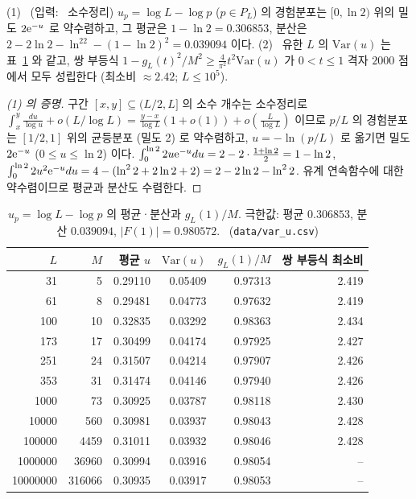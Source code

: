 \begin{proposition}\label{NUM:prop-var}
(1) \PROVED\ (입력: \EXT\ 소수정리) $u_p=\log L-\log p$ ($p\in P_L$) 의 경험분포는 $[0,\ln2)$ 위의 밀도 $2\mathrm{e}^{-u}$ 로 약수렴하고,
그 평균은 $1-\ln2=0.306853$, 분산은 $2-2\ln2-\ln^22-(1-\ln2)^2=0.039094$ 이다.
(2) \NUMERIC\ 유한 $L$ 의 $\mathrm{Var}(u)$ 는 표~\ref{NUM:tab-var} 와 같고, 쌍 부등식
$1-g_L(t)^2/M^2\ge\frac{4}{\pi^2}t^2\mathrm{Var}(u)$ 가 $0<t\le1$ 격자 $2000$ 점에서 모두 성립한다 (최소비 $\approx2.42$; $L\le10^5$).
\end{proposition}
\begin{proof}[(1) 의 증명]
구간 $[x,y]\subseteq(L/2,L]$ 의 소수 개수는 소수정리로 $\int_x^y\frac{du}{\log u}+o(L/\log L)=\frac{y-x}{\log L}(1+o(1))+o(\frac L{\log L})$ 이므로
$p/L$ 의 경험분포는 $[1/2,1]$ 위의 균등분포 (밀도 2) 로 약수렴하고, $u=-\ln(p/L)$ 로 옮기면 밀도 $2\mathrm{e}^{-u}$ ($0\le u\le\ln2$) 이다.
$\int_0^{\ln2}2u\mathrm{e}^{-u}du=2-2\cdot\frac{1+\ln2}{2}=1-\ln2$, $\int_0^{\ln2}2u^2\mathrm{e}^{-u}du=4-(\ln^22+2\ln2+2)=2-2\ln2-\ln^22$.
유계 연속함수에 대한 약수렴이므로 평균과 분산도 수렴한다.
\end{proof}

\begin{table}[ht]\centering\small
\begin{tabular}{rrrrrr}
\toprule
$L$ & $M$ & 평균 $u$ & $\mathrm{Var}(u)$ & $g_L(1)/M$ & 쌍 부등식 최소비\\
\midrule
31 & 5 & 0.29110 & 0.05409 & 0.97313 & 2.419\\
61 & 8 & 0.29481 & 0.04773 & 0.97632 & 2.419\\
100 & 10 & 0.32835 & 0.03292 & 0.98363 & 2.434\\
173 & 17 & 0.30499 & 0.04174 & 0.97925 & 2.427\\
251 & 24 & 0.31507 & 0.04214 & 0.97907 & 2.426\\
353 & 31 & 0.31474 & 0.04146 & 0.97940 & 2.426\\
1000 & 73 & 0.30925 & 0.03787 & 0.98118 & 2.430\\
10000 & 560 & 0.30981 & 0.03937 & 0.98043 & 2.428\\
100000 & 4459 & 0.31011 & 0.03932 & 0.98046 & 2.428\\
1000000 & 36960 & 0.30994 & 0.03916 & 0.98054 & --\\
10000000 & 316066 & 0.30935 & 0.03917 & 0.98053 & --\\
\bottomrule
\end{tabular}
\caption{$u_p=\log L-\log p$ 의 평균·분산과 $g_L(1)/M$. 극한값: 평균 $0.306853$, 분산 $0.039094$, $|F(1)|=0.980572$. \NUMERIC\ (\texttt{data/var\_u.csv})}\label{NUM:tab-var}
\end{table}

